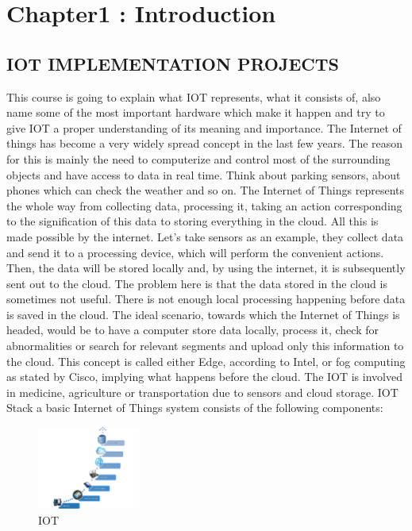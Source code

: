 \section{Chapter1 : Introduction} 

\subsection{ IOT IMPLEMENTATION PROJECTS }
This course is going to explain what IOT represents, what it consists of, also name some of the most important hardware which make it happen and try to give IOT a proper understanding of its meaning and importance.  The Internet of things has become a very widely spread concept in the last few years. The reason for this is mainly the need to computerize and control most of the surrounding objects and have access to data in real time. Think about parking sensors, about phones which can check the weather and so on.  The Internet of Things represents the whole way from collecting data, processing it, taking an action corresponding to the signification of this data to storing everything in the cloud. All this is made possible by the internet.  Let's take sensors as an example, they collect data and send it to a processing device, which will perform the convenient actions. Then, the data will be stored locally and, by using the internet, it is subsequently sent out to the cloud. The problem here is that the data stored in the cloud is sometimes not useful. There is not enough local processing happening before data is saved in the cloud.  The ideal scenario, towards which the Internet of Things is headed, would be to have a computer store data locally, process it, check for abnormalities or search for relevant segments and upload only this information to the cloud. This concept is called either Edge, according to Intel, or fog computing as stated by Cisco, implying what happens before the cloud.  The IOT is involved in medicine, agriculture or transportation due to sensors and cloud storage.
IOT Stack a basic Internet of Things system consists of the following components:  

\begin{figure}[ht]
    \centering
    \includegraphics[width=0.3\textwidth]{figures/IOT.png}
    \caption{IOT}
\end{figure}


